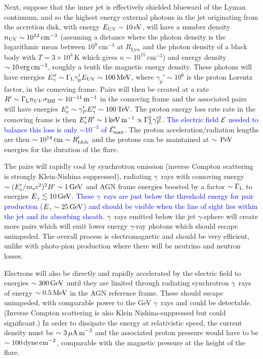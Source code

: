 \documentclass[twocolumn,linenumbers]{aastex62}
\newcommand{\Grays}{$\gamma$~rays\xspace}
\newcommand{\gray}{$\gamma$-ray\xspace}
\newcommand{\response}[1]{\textcolor{blue}{#1}}
\begin{document}
Next, suppose that the inner jet is effectively shielded blueward of the Lyman continuum, and so the highest energy external photons in the jet originating from the accretion disk, with energy $E_{\rm UV}\sim10\,{\rm eV}$, will have a number density $n_{\rm UV}\sim10^{12}\,{\rm cm}^{-3}$ (assuming a distance where the photon density is the logarithmic mean between $10^9\,\mathrm{cm}^{-3}$ at $R_\mathrm{Ly\alpha}$ and the photon density of a black body with $T = 3\times10^4\,$K which gives $n\sim10^{15}\,\mathrm{cm}^{-3}$) and energy density $\sim10\,{\rm erg\,cm}^{-3}$, roughly a tenth the magnetic energy density. These photons will have energies $E_\gamma''\sim\Gamma_{\rm L}\gamma_p'E_{\rm UV}\sim100\,{\rm MeV}$, where $\gamma_p'\sim10^6$ is the proton Lorentz factor, in the comoving frame. Pairs will then be created at a rate $R'\sim\Gamma_{\rm L}n_{UV}\sigma_{\rm BH}\sim10^{-11}\,{\rm m}^{-1}$ in the comoving frame and the associated pairs will have energies $E_e'\sim \gamma_P'E_\gamma''\sim100\,{\rm TeV}$. The proton energy loss rate rate in the comoving frame is then $E_e'R'\sim1\,{\rm keV}\,{\rm m}^{-1}\propto\Gamma_L^2\gamma_P'^2$. 
\response{
The electric field $\cal E$ needed to balance this loss is only $\sim10^{-3}$ of ${\cal E}_{\rm max}'$. 
}
The proton acceleration/radiation lengths are then $\sim10^{14}\,{\rm cm}\sim R_{\rm blob}'$ and the protons can be maintained at $\sim\,{\rm PeV}$ energies for the duration of the flare.

The pairs will rapidly cool by synchrotron emission (inverse Compton scattering is strongly Klein-Nishina suppressed), radiating \Grays with comoving energy $\sim (E_e'/m_ec^2)^2 B' \sim 1\,{\rm GeV}$ and AGN frame energies boosted by a factor $\sim\Gamma_{\rm L}$ to energies $E_\gamma\lesssim10\,{\rm GeV}$. 
\response{
These \Grays are just below the threshold energy for pair production ($E_\gamma\sim25\,{\rm GeV}$) and should be visible when the line of sight lies within the jet and its absorbing sheath.
}
\Grays emitted below the jet $\gamma$-sphere will create more pairs which will emit lower energy \gray photons which should escape unimpeded. The overall process is electromagnetic and should be very efficient, unlike with photo-pion production where there will be neutrino and neutron losses. 

Electrons will also be directly and rapidly accelerated by the electric field to energies $\sim300\,{\rm GeV}$ until they are limited through radiating synchrotron \Grays of energy $\sim0.5\,{\rm MeV}$ in the AGN reference frame. These should escape unimpeded, with comparable power to the GeV \Grays and could be detectable. (Inverse Compton scattering is also Klein Nishina-suppressed but could significant.) In order to dissipate the energy at relativistic speed, the current density must be $\sim3\,\mu{\rm A\,m}^{-2}$ and the associated proton pressure would have to be $\sim100\,{\rm dyne\,cm}^{-2}$, comparable with the magnetic pressure at the height of the flare.
\end{document}
